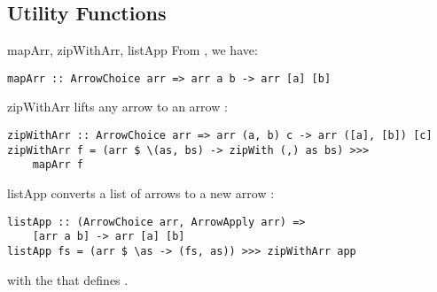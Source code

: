 \subsection{Utility Functions}\label{utilfns}
\begin{frame}[fragile]{mapArr, zipWithArr, listApp}
From \cite{programming_with_arrows}, we have:
\begin{lstlisting}[frame=htrbl]
mapArr :: ArrowChoice arr => arr a b -> arr [a] [b]
\end{lstlisting}

zipWithArr lifts any arrow  to an arrow :
\begin{lstlisting}[frame=htrbl]
zipWithArr :: ArrowChoice arr => arr (a, b) c -> arr ([a], [b]) [c]
zipWithArr f = (arr $ \(as, bs) -> zipWith (,) as bs) >>>
	mapArr f
\end{lstlisting}
listApp converts a list of arrows \code{[arr a b]} to a new arrow :
\begin{lstlisting}[frame=htrbl]
listApp :: (ArrowChoice arr, ArrowApply arr) =>
	[arr a b] -> arr [a] [b]
listApp fs = (arr $ \as -> (fs, as)) >>> zipWithArr app
\end{lstlisting}
with the  that defines .
\end{frame}
